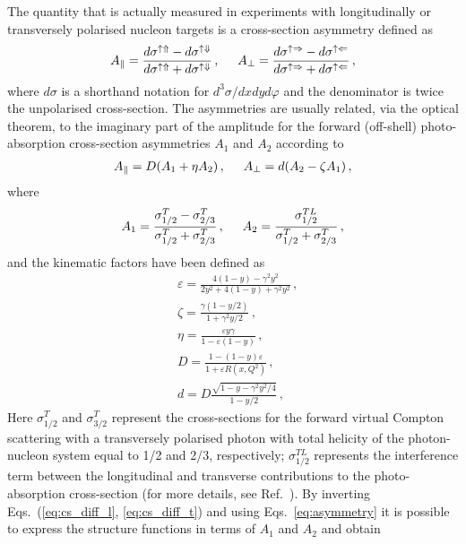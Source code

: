 The quantity that is actually measured in experiments with longitudinally or transversely polarised nucleon targets is a cross-section asymmetry defined as
\begin{equation}
  A_{\parallel} = \frac{d\sigma^{\uparrow \Uparrow} - d\sigma^{\uparrow \Downarrow}}{d\sigma^{\uparrow \Uparrow} + d\sigma^{\uparrow \Downarrow}} \,, \hspace{5mm}  A_{\perp} = \frac{d\sigma^{\uparrow \Rightarrow} - d\sigma^{\uparrow \Leftarrow}}{d\sigma^{\uparrow \Rightarrow} + d\sigma^{\uparrow \Leftarrow}} \,,
  \label{eq:asymmetry}
\end{equation}
where $d\sigma$ is a shorthand notation for $d^3\sigma/dxdyd\varphi$ and the denominator is twice the unpolarised cross-section. The asymmetries are usually related, via the optical theorem, to the imaginary part of the amplitude for the forward (off-shell) photo-absorption cross-section asymmetries $A_1$ and $A_2$ according to
\begin{align}
  A_{\parallel} = D(A_1 + \eta A_2)\,, \hspace{5mm} A_{\perp} = d(A_2 - \zeta A_1)\,,
\end{align}
where 
\begin{equation}
  A_1 = \frac{\sigma_{1/2}^T - \sigma_{2/3}^T}{\sigma_{1/2}^T + \sigma_{2/3}^T} \,, \hspace{5mm} A_2 = \frac{\sigma_{1/2}^{TL}}{\sigma_{1/2}^T + \sigma_{2/3}^T}\,,
\end{equation}
and the kinematic factors have been defined as 
\begin{align}
  & \varepsilon = \frac{4(1-y) - \gamma^2 y^2}{2 y^2 + 4(1-y) + \gamma^2 y^2} \,,\\
  & \zeta = \frac{\gamma(1 - y/2)}{1 + \gamma^2y/2} \,,\\
  & \eta = \frac{\varepsilon y \gamma}{1 - \varepsilon(1 - y)} \,,\\
  & D = \frac{1 - (1 - y)\varepsilon }{1 + \varepsilon R (x,Q^2)} \,,\\
  & d = D \frac{\sqrt{1 - y - \gamma^2 y^2 /4}}{1 - y/2}\,,
\end{align}
Here $\sigma_{1/2}^T$ and $\sigma_{3/2}^T$ represent the cross-sections for the forward virtual Compton scattering with a transversely polarised photon with total helicity of the photon-nucleon system equal to 1/2 and 2/3, respectively; $\sigma_{1/2}^{TL}$ represents the interference term between the longitudinal and transverse contributions to the photo-absorption cross-section (for more details, see Ref.~\cite{leader_predazzi_1996}). By inverting Eqs.~(\ref{eq:cs_diff_l}, \ref{eq:cs_diff_t}) and using Eqs.~\eqref{eq:asymmetry} it is possible to express the structure functions in terms of $A_1$ and $A_2$ and obtain
